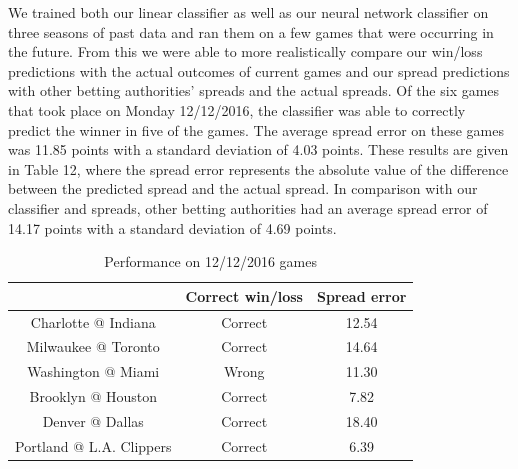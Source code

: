 \documentclass{article}
\begin{document}
We trained both our linear classifier as well as our neural network classifier on three seasons of past data and ran them on a few games that were occurring in the future. From this we were able to more realistically compare our win/loss predictions with the actual outcomes of current games and our spread predictions with other betting authorities' spreads and the actual spreads. Of the six games that took place on Monday 12/12/2016, the classifier was able to correctly predict the winner in five of the games. The average spread error on these games was 11.85 points with a standard deviation of 4.03 points. These results are given in Table 12, where the spread error represents the absolute value of the difference between the predicted spread and the actual spread. In comparison with our classifier and spreads, other betting authorities had an average spread error of 14.17 points with a standard deviation of 4.69 points.

\begin{table}
  \begin{center}
    \begin{tabular}{ | c | c | c | }
      \hline
                                & Correct win/loss     & Spread error  \\ \hline
      Charlotte @ Indiana       & Correct              & 12.54    \\ \hline
      Milwaukee @ Toronto       & Correct              & 14.64    \\ \hline
      Washington @ Miami        & Wrong                & 11.30     \\ \hline
      Brooklyn @ Houston        & Correct              & 7.82      \\ \hline
      Denver @ Dallas           & Correct              & 18.40    \\ \hline
      Portland @ L.A. Clippers  & Correct              & 6.39    \\ \hline
    \end{tabular}
  \end{center}
  \caption{Performance on 12/12/2016 games}
\end{table}
\end{document}
